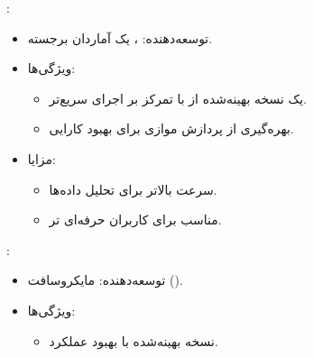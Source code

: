 \documentclass[11pt, a4paper, oneside]{book}
\newcounter{itemadded}
\let\LaTeXStandardEnumerateBegin\enumerate
\let\LaTeXStandardEnumerateEnd\endenumerate
\renewenvironment{enumerate}{%
	\LaTeXStandardEnumerateBegin%
	\setcounter{itemadded}{0}
}{%
	\LaTeXStandardEnumerateEnd%
}%
\begin{document}
\begin{enumerate}
\begin{itemize}
\begin{itemize}
					\end{itemize}
					
				\end{itemize}
				
				
				\item {\large {}}:
				
				\begin{itemize}
					
					\item  {\large توسعه‌دهنده}:
					{\normalsize {}، یک آماردان برجسته.}
					
					\item {\large ویژگی‌ها}:
					
					\begin{itemize}
						
						\item یک نسخه بهینه‌شده از  با تمرکز بر اجرای سریع‌تر.
						
						\item بهره‌گیری از پردازش موازی برای بهبود کارایی.
						
					\end{itemize}
					
					\item {\large مزایا}:
					
					\begin{itemize}
						
						\item سرعت بالاتر برای تحلیل داده‌ها.
						
						\item مناسب برای کاربران حرفه‌ای تر.
						
					\end{itemize}
					
				\end{itemize}
				
				
				\item {\large {}}:
				
				\begin{itemize}
					
					\item  {\large توسعه‌دهنده}:
					{\normalsize مایکروسافت ().}
					
					\item {\large ویژگی‌ها}:
					
					\begin{itemize}
						
						\item نسخه بهینه‌شده  با بهبود عملکرد.
						

\end{itemize}
\end{itemize}
\end{enumerate}
\end{document}
